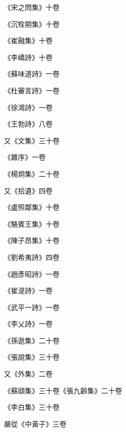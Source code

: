 \begin{pinyinscope}
 《宋之問集》十卷



 《沉牷期集》十卷



 《崔融集》十卷



 《李嶠詩》十卷



 《蘇味道詩》一卷



 《杜審言詩》一卷



 《徐鴻詩》一卷



 《王勃詩》八卷



 又《文集》三十卷



 《雜序》一卷



 《楊炯集》二十卷



 又《拾遺》四卷



 《盧照鄰集》十卷



 《駱賓王集》十卷



 《陳子昂集》十卷



 《劉希夷詩》四卷



 《趙彥昭詩》一卷



 《崔湜詩》一卷



 《武平一詩》一卷



 《李乂詩》一卷



 《孫逖集》二十卷



 《張說集》三十卷



 又《外集》二卷



 《蘇頲集》三十卷《張九齡集》二十卷



 《李白集》三十卷



 嚴從《中黃子》三卷




\end{pinyinscope}
